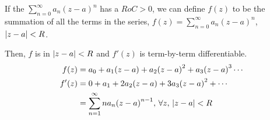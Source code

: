 \begin{theorem}\label{thm:Power_Series-Analytic_Function}
  If the  $\sum_{n=0}^{\infty} a_{n} {(z-a)}^{n}$ has a  $RoC > 0$, we can define $f(z)$ to be the summation of all the terms in the series, $f(z) = \sum_{n = 0}^{\infty} a_{n} {(z-a)}^{n}$, $\left\lvert z-a \right\rvert < R$.

  Then, $f$ is  in $\left\lvert z-a \right\rvert < R$ and $f'(z)$ is term-by-term differentiable.
  \begin{align*}
    f(z) &= a_{0} + a_{1} (z-a) + a_{2} {(z-a)}^{2} + a_{3} {(z-a)}^{3} \cdots \\
    f'(z) &= 0 + a_{1} + 2 a_{2} (z-a) + 3 a_{3} {(z-a)}^{2} + \cdots \\
         &= \sum_{n=1}^{\infty} n a_{n} {(z-a)}^{n-1}, \, \forall z, \, \left\lvert z-a \right\rvert < R
  \end{align*}
\end{theorem}

